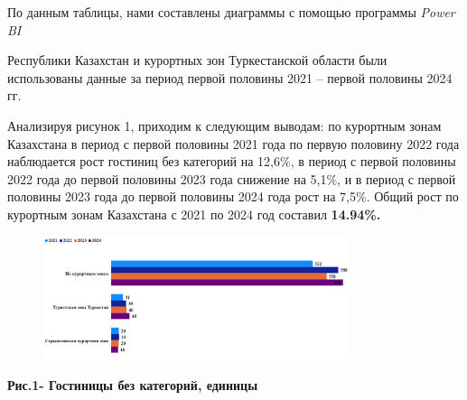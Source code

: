 
По данным таблицы, нами составлены диаграммы с помощью программы
\emph{Power BI}

Республики Казахстан и курортных зон Туркестанской области были
использованы данные за период первой половины 2021 -- первой половины
2024 гг.

Анализируя рисунок 1, приходим к следующим выводам: по курортным зонам
Казахстана в период с первой половины 2021 года по первую половину 2022
года наблюдается рост гостиниц без категорий на 12,6\%, в период с
первой половины 2022 года до первой половины 2023 года снижение на
5,1\%, и в период с первой половины 2023 года до первой половины 2024
года рост на 7,5\%. Общий рост по курортным зонам Казахстана с 2021 по
2024 год составил {\bfseries 14.94\%.}


\begin{figure}[H]
	\centering
	\includegraphics[width=0.8\textwidth]{media/ekon2/image3}
	\caption*{}
\end{figure}


{\bfseries Рис.1- Гостиницы без категорий, единицы}

